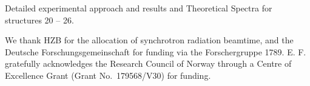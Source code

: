 \documentclass[journal=jpccck,manuscript=article]{achemso}
\begin{document}
\begin{suppinfo}

Detailed experimental approach and results and Theoretical Spectra
for structures 20 -- 26.

\end{suppinfo}

\begin{acknowledgement}
%
We thank HZB for the allocation of synchrotron radiation beamtime, and the
Deutsche Forschungsgemeinschaft for funding via the Forschergruppe 1789.
E. F. gratefully acknowledges the Research
Council of Norway through a Centre of Excellence Grant (Grant No.\ 179568/V30)
for funding.
%
\end{acknowledgement}

%
\end{document}
